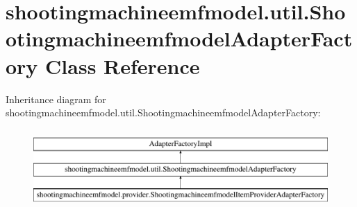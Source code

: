 \hypertarget{classshootingmachineemfmodel_1_1util_1_1_shootingmachineemfmodel_adapter_factory}{\section{shootingmachineemfmodel.\-util.\-Shootingmachineemfmodel\-Adapter\-Factory Class Reference}
\label{classshootingmachineemfmodel_1_1util_1_1_shootingmachineemfmodel_adapter_factory}
}
Inheritance diagram for shootingmachineemfmodel.\-util.\-Shootingmachineemfmodel\-Adapter\-Factory\-:\begin{figure}[H]
\begin{center}
\leavevmode
\includegraphics[height=3.000000cm]{classshootingmachineemfmodel_1_1util_1_1_shootingmachineemfmodel_adapter_factory}
\end{center}
\end{figure}
